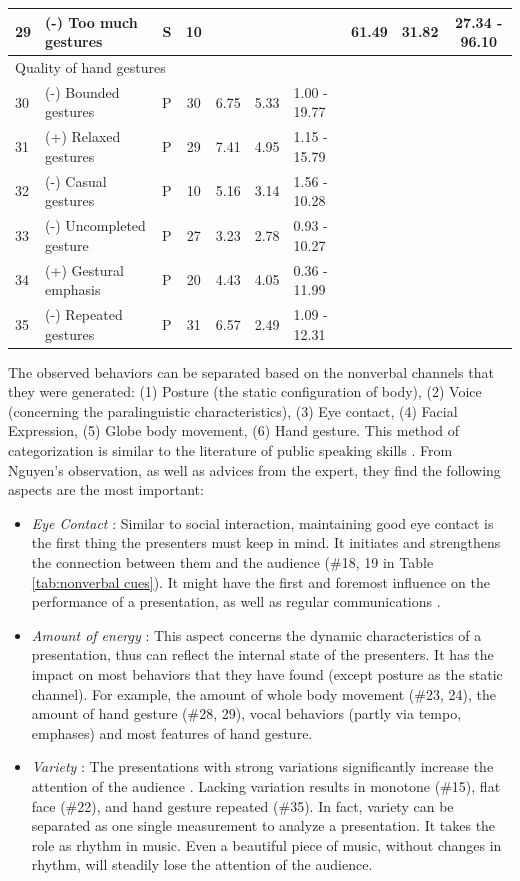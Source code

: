 \begin{table}
{\begin{tabular}{llcclllccc}
29 & (-) Too much gestures & S & 10 &  &  &  & 61.49 & 31.82 & 27.34 - 96.10 \\ \hline
\multicolumn{10}{l}{Quality of hand gestures} \\
30 & (-) Bounded gestures & P & 30 & 6.75 & 5.33 & 1.00 - 19.77 &  &  &  \\
31 & (+) Relaxed gestures & P & 29 & 7.41 & 4.95 & 1.15 - 15.79 &  &  &  \\
32 & (-) Casual gestures & P & 10 & 5.16 & 3.14 & 1.56 - 10.28 &  &  &  \\
33 & (-) Uncompleted gesture & P & 27 & 3.23 & 2.78 & 0.93 - 10.27 &  &  &  \\
34 & (+) Gestural emphasis & P & 20 & 4.43 & 4.05 & 0.36 - 11.99 &  &  &  \\
35 & (-) Repeated gestures & P & 31 & 6.57 & 2.49 & 1.09 - 12.31 &  &  &  \\ \hline
\end{tabular}%
}
\end{table}
\newpage
\par The observed behaviors can be separated based on the nonverbal channels that they were generated: (1) Posture (the static configuration of body), (2) Voice (concerning the paralinguistic characteristics), (3) Eye contact, (4) Facial Expression, (5) Globe body movement, (6) Hand gesture. This method of categorization is similar to the literature of public speaking skills \cite{rodman1996style}. From Nguyen's observation, as well as advices from the expert, they find the following aspects are the most important:

\begin{itemize}
  \item \textit{Eye Contact} : Similar to social interaction, maintaining good eye contact is the first thing the presenters must keep in mind. It initiates and strengthens the connection between them and the audience (\#18, 19 in Table \ref{tab:nonverbal cues}). It might have the first and foremost influence on the performance of a presentation, as well as regular communications \cite{Zimmerman2009}.
  \item \textit{Amount of energy} : This aspect concerns the dynamic characteristics of a presentation, thus can reflect the internal state of the presenters. It has the impact on most behaviors that they have found (except posture as the static channel). For example, the amount of whole body movement (\#23, 24), the amount of hand gesture (\#28, 29), vocal behaviors (partly via tempo, emphases) and most features of hand gesture.
  \item \textit{Variety} : The presentations with strong variations significantly increase the attention of the audience \cite{nguyen2015intelligent}. Lacking variation results in monotone (\#15), flat face (\#22), and hand gesture repeated (\#35). In fact, variety can be separated as one single measurement to analyze a presentation. It takes the role as rhythm in music. Even a beautiful piece of music, without changes in rhythm, will steadily lose the attention of the audience.  

\end{itemize}

